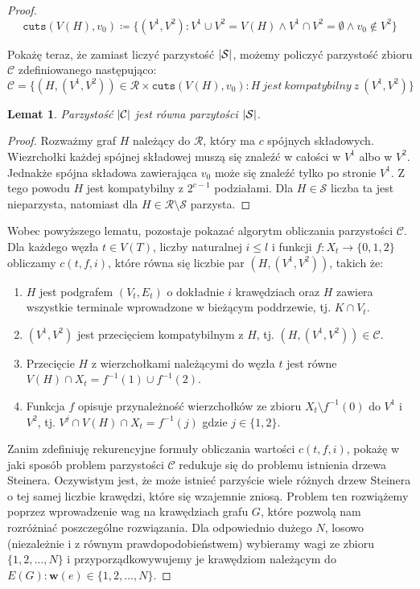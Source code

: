 \documentclass[12pt, oneside]{report}
\newtheorem{lemma}{Lemat}
\begin{document}
\begin{proof}
$$\texttt{cuts} (V(H), v_0) \coloneqq \{(V^1, V^2): V^1 \cup V^2 = V(H) \wedge V^1 \cap V^2 = \emptyset \wedge v_0 \notin V^2\}$$

Pokażę teraz, że zamiast liczyć parzystość $\abs{\mathcal{S}}$, możemy policzyć parzystość zbioru $\mathcal{C}$ zdefiniowanego następująco:
$$\mathcal{C} = \{(H, (V^1, V^2)) \in \mathcal{R} \times \texttt{cuts}(V(H), v_0) : H\ jest\ kompatybilny\ z\ (V^1, V^2)\}$$

\begin{lemma}
Parzystość $\abs{\mathcal{C}}$ jest równa parzytości $\abs{\mathcal{S}}$.
\end{lemma}

\begin{proof}
Rozważmy graf $H$ należący do $\mathcal{R}$, który ma $c$ spójnych składowych. Wiezrchołki każdej spójnej składowej muszą się znaleźć w całości w $V^1$ albo w $V^2$. Jednakże spójna składowa zawierająca $v_0$ może się znaleźć tylko po stronie $V^1$. Z tego powodu $H$ jest kompatybilny z $2^{c-1}$ podziałami. Dla $H \in \mathcal{S}$ liczba ta jest nieparzysta, natomiast dla $H \in \mathcal{R} \setminus \mathcal{S}$ parzysta. 
\end{proof}

Wobec powyższego lematu, pozostaje pokazać algorytm obliczania parzystości $\mathcal{C}$. Dla każdego węzła $t \in V(T)$, liczby naturalnej $i \leq l$ i funkcji $f: X_t \to \{0,1,2\}$ obliczamy $c(t, f, i)$, które równa się liczbie par $(H, (V^1, V^2))$, takich że:

\begin{enumerate}[label=(\roman*)]
\item $H$ jest podgrafem $(V_t, E_t)$ o dokładnie $i$ krawędziach oraz $H$ zawiera wszystkie terminale wprowadzone w bieżącym poddrzewie, tj. $K \cap V_t$.
\item $(V^1, V^2)$ jest przecięciem kompatybilnym z $H$, tj. $(H, (V^1, V^2)) \in \mathcal{C}$.
\item Przecięcie $H$ z wierzchołkami należącymi do węzła $t$ jest równe $V(H) \cap X_t = f^{-1}(1) \cup f^{-1}(2)$.
\item Funkcja $f$ opisuje przynależność wierzchołków ze zbioru $X_t \setminus f^{-1}(0)$ do $V^1$ i $V^2$, tj. $V^j \cap V(H) \cap X_t = f^{-1}(j)$ gdzie $j \in \{1,2\}$.
\end{enumerate} 

Zanim zdefiniuję rekurencyjne formuły obliczania wartości $c(t, f, i)$, pokażę w jaki sposób problem parzystości $\mathcal{C}$ redukuje się do problemu istnienia drzewa Steinera. Oczywistym jest, że może istnieć parzyście wiele różnych drzew Steinera o tej samej liczbie krawędzi, które się wzajemnie zniosą. Problem ten rozwiążemy poprzez wprowadzenie wag na krawędziach grafu $G$, które pozwolą nam rozróżniać poszczególne rozwiązania. 
Dla odpowiednio dużego $N$, losowo (niezależnie i z równym prawdopodobieństwem) wybieramy wagi ze zbioru $\{1,2,\dots,N\}$ i przyporządkowywujemy je krawędziom należącym do $E(G): \mathbf{w}(e) \in \{1,2,\dots,N\}$. 


\end{proof}
\end{document}

